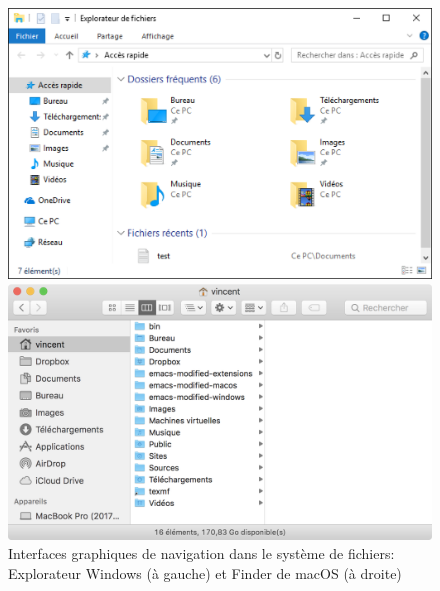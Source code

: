 \begin{figure}
  \begin{minipage}{0.48\linewidth}
    \includegraphics[width=\linewidth]{images/explorer}
  \end{minipage}
  \hfill
  \begin{minipage}{0.48\linewidth}
    \includegraphics[width=\linewidth]{images/finder}
  \end{minipage}
  \caption[Interfaces graphiques de navigation dans le système de
  fichiers]{Interfaces graphiques de navigation dans le système de
    fichiers: Explorateur Windows (à gauche) et Finder de macOS (à
    droite)}
  \label{fig:informatique:explorer+finder}
\end{figure}


